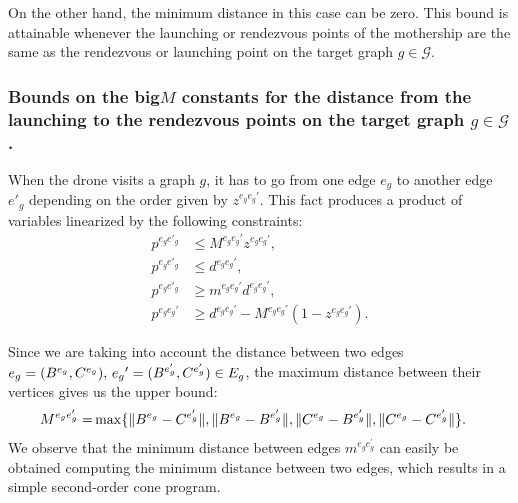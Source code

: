 \documentclass[10pt,a4paper]{elsarticle}
\newcommand{\RE}[1]{{\color{black}#1}}
\newcommand{\EN}[1]{{\color{black}#1}}
\begin{document}
				\noindent
				On the other hand, the minimum distance in this case can be zero. This bound is attainable whenever the launching or rendezvous points of the mothership are the same \EN{as} the rendezvous or launching point on the target graph $g\in \mathcal{G}$.
				
		
			
			
			\subsubsection*{Bounds on the big$M$ constants for the distance from the launching to the rendezvous points on the target graph $g\in \mathcal{G}$.} 
			\noindent
			When the drone visits a graph $g$, it has to go from one edge $e_g$ to another edge $e'_g$ depending on the order given by $z^{e_ge_g'}$. This fact produces a product of variables linearized by the following constraints:
			\begin{align*}
				p^{e_ge'_g} & \leq M^{e_ge_g'} z^{e_ge_g'}, \\
				p^{e_ge'_g} & \leq d^{e_ge_g'}, \\
				p^{e_ge'_g} & \geq m^{e_ge_g'} d^{e_ge_g'}, \\
				p^{e_ge_g'} & \geq d^{e_ge_g'} - M^{e_ge_g'}(1-z^{e_ge_g'}).
			\end{align*}
			
			\noindent
			Since we are taking into account the distance between two edges $e\RE{_g}=(B^{e_g},C^{e_g}), \, e\RE{_g}'=(B^{e^\prime_g},C^{e^\prime_g})\in E_g$, the maximum distance between their vertices gives us the upper bound:
			\begin{align*}
				M^{e_g e^\prime_g} = & \max\{\|B^{e_g} - C^{e^\prime_g}\|, \|B^{e_g} - B^{e^\prime_g}\|, \|C^{e_g} - B^{e^\prime_g}\|, \|C^{e_g} - C^{\RE{e'_g}}\|\}. 
			\end{align*}
			We observe that the minimum distance between edges $m^{e_g e^\prime_g}$ can \EN{easily be} obtained computing the minimum distance between two edges, which results in a simple second-order cone program.
			
		
			
			
\end{document}
